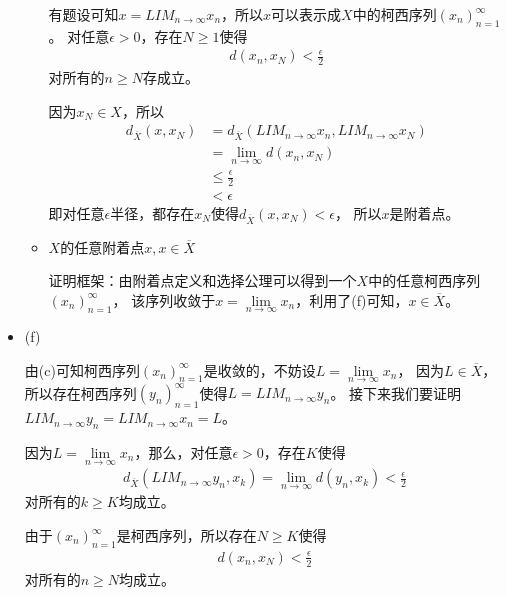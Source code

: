 \documentclass{article}
\begin{document}
\begin{itemize}
\begin{itemize}
                有题设可知$x = LIM_{n \to \infty} x_n$，所以$x$可以表示成$X$中的柯西序列$(x_n)_{n=1}^\infty$。
                对任意$\epsilon > 0$，存在$N \geq 1$使得
                \begin{align*}
                  d(x_n, x_N) < \frac{\epsilon}{2}
                \end{align*}
                对所有的$n \geq N$存成立。

                因为$x_N \in X$，所以
                \begin{align*}
                  d_{\overline{X}}(x, x_N) & = d_{\overline{X}}(LIM_{n \to \infty} x_n, LIM_{n \to \infty} x_N) \\
                                           & = \lim \limits_{n \to \infty} d(x_n, x_N)                          \\
                                           & \leq \frac{\epsilon}{2}                                            \\
                                           & < \epsilon
                \end{align*}
                即对任意$\epsilon$半径，都存在$x_N$使得$d_{\overline{X}}(x, x_N) < \epsilon$，
                所以$x$是附着点。

          \item $X$的任意附着点$x, x \in \overline{X}$

                证明框架：由附着点定义和选择公理可以得到一个$X$中的任意柯西序列$(x_n)_{n=1}^\infty$，
                该序列收敛于$x = \lim\limits_{n \to \infty} x_n$，利用了(f)可知，$x \in \overline{X}$。
        \end{itemize}

  \item (f)

        由(c)可知柯西序列$(x_n)_{n=1}^\infty$是收敛的，不妨设$L = \lim\limits_{n \to \infty} x_n$，
        因为$L \in \overline{X}$，所以存在柯西序列$(y_n)_{n=1}^\infty$使得$L = LIM_{n \to \infty} y_n$。
        接下来我们要证明$LIM_{n \to \infty} y_n = LIM_{n \to \infty} x_n = L$。

        因为$L = \lim\limits_{n \to \infty} x_n$，那么，对任意$\epsilon > 0$，存在$K$使得
        \begin{align*}
          d_{\overline{X}}(LIM_{n \to \infty} y_n, x_k) = \lim\limits_{n \to \infty} d(y_n, x_k) < \frac{\epsilon}{2}
        \end{align*}
        对所有的$k \geq K$均成立。

        由于$(x_n)_{n=1}^\infty$是柯西序列，所以存在$N \geq K$使得
        \begin{align*}
          d(x_n, x_N) < \frac{\epsilon}{2}
        \end{align*}
        对所有的$n \geq N$均成立。


\end{itemize}
\end{document}
